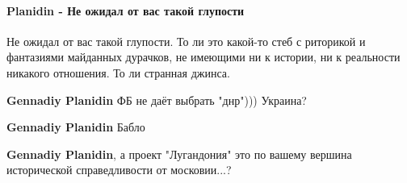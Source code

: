  
 
 
 
 
\paragraph{Planidin - Не ожидал от вас такой глупости}
\label{sec:14_07_2021.fb.krjukova_svetlana.1.statja_putina_mnenie.cmt.planidin_glupost_ozhidanie}

\begin{itemize}
 
Не ожидал от вас такой глупости.
То ли это какой-то стеб с риторикой и фантазиями майданных дурачков, не имеющими ни к истории, ни к реальности никакого отношения.
То ли странная джинса.

\begin{itemize}
 
\textbf{Gennadiy Planidin} ФБ не даёт выбрать "днр"))) Украина?

 
\textbf{Gennadiy Planidin}
Бабло

 
\textbf{Gennadiy Planidin}, а проект "Лугандония" это по вашему вершина исторической справедливости от московии...?


\end{itemize}
\end{itemize}
